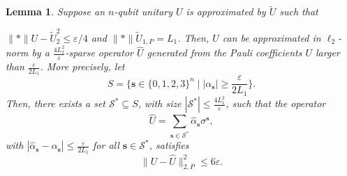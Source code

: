 \documentclass[10pt,a4paper]{amsart}
\newtheorem{lemma}{Lemma}
\newcommand{\CS}{\mathcal{S}}
\newcommand{\avec}[2]{\norm{#1}_{#2,P}}
\newcommand{\bfs}{\mathbf{s}}
\newcommand{\norm}[1]{\lVert#1\rVert}
\begin{document}
    \begin{lemma}
        Suppose an $n$-qubit unitary $U$ is approximated by $\tilde{U}$ such that 
        
        
        $\norm*{U - \tilde{U}}_{2}^2 \le \varepsilon/4$ and 
        $\norm*{\tilde{U}}_{1,P} = L_1$. 
        Then, $U$ can be approximated in $\ell_2$-norm by a $\tfrac{4L_1^2}{\varepsilon}$-sparse operator $\hat{U}$ generated from the Pauli coefficients $U$ larger than $\tfrac{\varepsilon}{2L_1}$. 
         More precisely, let $$S = \{\bfs\in \{0,1,2,3\}^n \mid |\alpha_{\bfs}| \ge {\frac{\varepsilon}{2L_1}} \}.$$ 
         Then, there exists a set $\mathcal{S}^* \subseteq S$,  with size $|\mathcal{S}^*| \le \tfrac{4L_1^2}{\varepsilon}$, such that the operator 
        \[
            \hat{U} = \sum_{\bfs \in \mathcal{S}^*} \hat{\alpha}_{\bfs} \sigma^{\bfs},
        \]
        with  $|\hat{\alpha}_{\bfs} - \alpha_{\bfs}| \le \frac{\varepsilon}{2L_1}$ for all $\bfs \in \CS^*$, 
        satisfies 
        \[
            \avec{U - \hat{U}}{2}^2 \le 6\varepsilon.
        \]
        \label{lm:app_unitary}
    \end{lemma}
\end{document}
